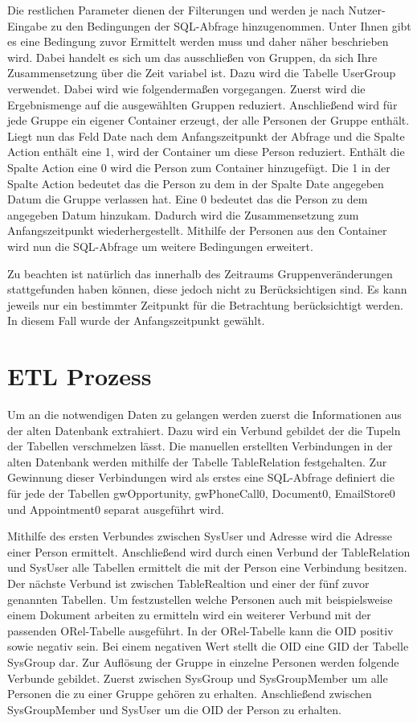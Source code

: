 Die restlichen Parameter dienen der Filterungen und werden je nach Nutzer-Eingabe zu den Bedingungen der SQL-Abfrage hinzugenommen. Unter Ihnen gibt es eine Bedingung zuvor Ermittelt werden muss und daher näher beschrieben wird. Dabei handelt es sich um das ausschließen von Gruppen, da sich Ihre Zusammensetzung über die Zeit variabel ist. Dazu wird die Tabelle UserGroup verwendet. Dabei wird wie folgendermaßen vorgegangen. Zuerst wird die Ergebnismenge auf die ausgewählten Gruppen reduziert. Anschließend wird für jede Gruppe ein eigener Container erzeugt, der alle Personen der Gruppe enthält. Liegt nun das Feld Date nach dem Anfangszeitpunkt der Abfrage und die Spalte Action enthält eine 1, wird der Container um diese Person reduziert. Enthält die Spalte Action eine 0 wird die Person zum Container hinzugefügt. Die 1 in der Spalte Action bedeutet das die Person zu dem in der Spalte Date angegeben Datum die Gruppe verlassen hat. Eine 0 bedeutet das die Person zu dem angegeben Datum hinzukam. Dadurch wird die Zusammensetzung zum Anfangszeitpunkt wiederhergestellt. Mithilfe der Personen aus den Container wird nun die SQL-Abfrage um weitere Bedingungen erweitert.

Zu beachten ist natürlich das innerhalb des Zeitraums Gruppenveränderungen stattgefunden haben können, diese jedoch nicht zu Berücksichtigen sind. Es kann jeweils nur ein bestimmter Zeitpunkt für die Betrachtung berücksichtigt werden. In diesem Fall wurde der Anfangszeitpunkt gewählt.

\section{ETL Prozess}

Um an die notwendigen Daten zu gelangen werden zuerst die Informationen aus der alten Datenbank extrahiert. Dazu wird ein Verbund gebildet der die Tupeln der Tabellen verschmelzen lässt. Die manuellen erstellten Verbindungen in der alten Datenbank werden mithilfe der Tabelle TableRelation festgehalten. Zur Gewinnung dieser Verbindungen wird als erstes eine SQL-Abfrage definiert die für jede der Tabellen gwOpportunity, gwPhoneCall0, Document0, EmailStore0 und Appointment0 separat ausgeführt wird. 

Mithilfe des ersten Verbundes zwischen SysUser und Adresse wird die Adresse einer Person ermittelt. Anschließend wird durch einen Verbund der TableRelation und SysUser alle Tabellen ermittelt die mit der Person eine Verbindung besitzen. Der nächste Verbund ist zwischen TableRealtion und einer der fünf zuvor genannten Tabellen. Um festzustellen welche Personen auch mit beispielsweise einem Dokument arbeiten zu ermitteln wird ein weiterer Verbund mit der passenden ORel-Tabelle ausgeführt. In der ORel-Tabelle kann die OID positiv sowie negativ sein. Bei einem negativen Wert stellt die OID eine GID der Tabelle SysGroup dar. Zur Auflösung der Gruppe in einzelne Personen werden folgende Verbunde gebildet. Zuerst zwischen SysGroup und SysGroupMember um alle Personen die zu einer Gruppe gehören zu erhalten. Anschließend zwischen SysGroupMember und SysUser um die OID der Person zu erhalten. 

